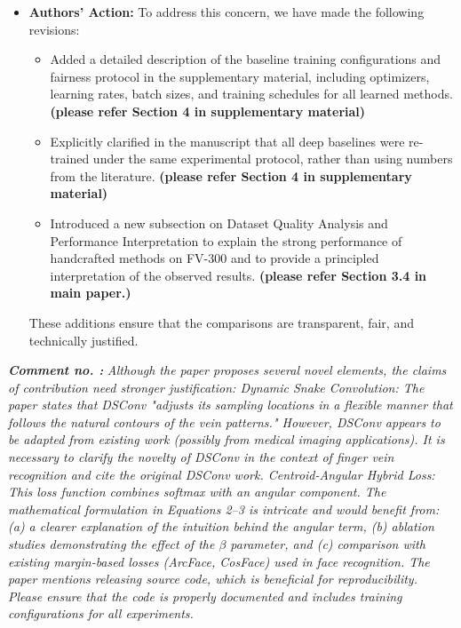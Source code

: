 \documentclass[11pt]{article}
\theoremstyle{remark}
\newcounter{mycounter} %
\newcommand\showReviewcounter{\stepcounter{mycounter}\themycounter}
\begin{document}
\begin{itemize}
	\item \textbf{Authors' Action:} 
	To address this concern, we have made the following revisions:
	\begin{itemize}
	    \item Added a detailed description of the {baseline training configurations and fairness protocol} in the supplementary material, including optimizers, learning rates, batch sizes, and training schedules for all learned methods. \textbf{(please refer Section 4 in supplementary material)}
	    \item Explicitly clarified in the manuscript that {all deep baselines were re-trained under the same experimental protocol}, rather than using numbers from the literature. \textbf{(please refer Section 4 in supplementary material)}
	    \item Introduced a new subsection on {Dataset Quality Analysis and Performance Interpretation} to explain the strong performance of handcrafted methods on FV-300 and to provide a principled interpretation of the observed results. \textbf{(please refer Section 3.4 in main paper.)}
	\end{itemize}
	These additions ensure that the comparisons are transparent, fair, and technically justified.
\end{itemize}

\color{blue} 
\textbf{\textit{Comment no. \showReviewcounter:}} 
\textit{Although the paper proposes several novel elements, the claims of contribution need stronger justification:
Dynamic Snake Convolution: The paper states that DSConv "adjusts its sampling locations in a flexible manner that follows the natural contours of the vein patterns." However, DSConv appears to be adapted from existing work (possibly from medical imaging applications). It is necessary to clarify the novelty of DSConv in the context of finger vein recognition and cite the original DSConv work.
Centroid-Angular Hybrid Loss: This loss function combines softmax with an angular component. The mathematical formulation in Equations 2--3 is intricate and would benefit from: (a) a clearer explanation of the intuition behind the angular term, (b) ablation studies demonstrating the effect of the $\beta$ parameter, and (c) comparison with existing margin-based losses (ArcFace, CosFace) used in face recognition. The paper mentions releasing source code, which is beneficial for reproducibility. Please ensure that the code is properly documented and includes training configurations for all experiments.}
\color{black}
\end{document}
